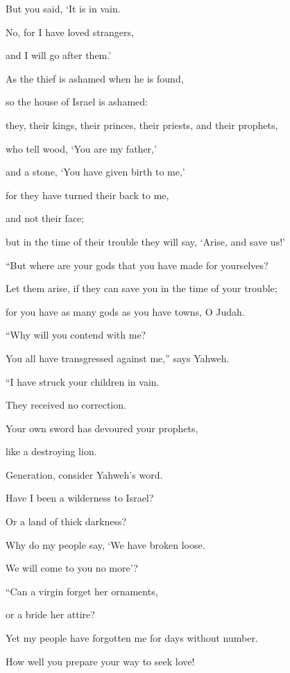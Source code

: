 {\par }{\Q But you said, ‘It is in vain.
\par }{\QB No, for I have loved strangers,
\par }{\QB and I will go after them.’
\par }{\Q {}As the thief is ashamed when he is found,
\par }{\QB so the house of Israel is ashamed:
\par }{\QB they, their kings, their princes, their priests, and their prophets,
\par }{\Q {}who tell wood, ‘You are my father,’
\par }{\QB and a stone, ‘You have given birth to me,’
\par }{\Q for they have turned their back to me,
\par }{\QB and not their face;
\par }{\QB but in the time of their trouble they will say, ‘Arise, and save us!’
\par }{\Q {}“But where are your gods that you have made for yourselves?
\par }{\QB Let them arise, if they can save you in the time of your trouble;
\par }{\QB for you have as many gods as you have towns, O Judah.
\par }{\Q {}“Why will you contend with me?
\par }{\QB You all have transgressed against me,” says Yahweh.
\par }{\Q {}“I have struck your children in vain.
\par }{\QB They received no correction.
\par }{\Q Your own sword has devoured your prophets,
\par }{\QB like a destroying lion.
\par }{\Q {}Generation, consider Yahweh’s word.
\par }{\QB Have I been a wilderness to Israel?
\par }{\QB Or a land of thick darkness?
\par }{\Q Why do my people say, ‘We have broken loose.
\par }{\QB We will come to you no more’?
\par }{\Q {}“Can a virgin forget her ornaments,
\par }{\QB or a bride her attire?
\par }{\QB Yet my people have forgotten me for days without number.
\par }{\Q {}How well you prepare your way to seek love!
}
